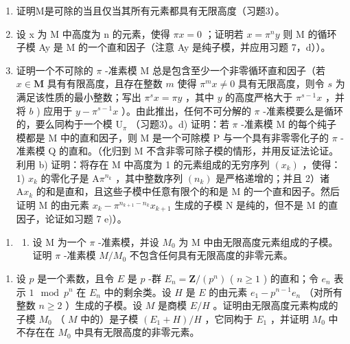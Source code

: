 \begin{enumerate}
\def\labelenumi{\alph{enumi})}
\item
  证明M是可除的当且仅当其所有元素都具有无限高度（习题3）。
\item
  设 x 为 M 中高度为 n 的元素，使得 \(\pi x = 0\) ；证明若 \(x = \pi^{n}y\) 则 M 的循环子模 Ay 是 M 的一个直和因子（注意 Ay 是纯子模，并应用习题 7，d））。
\item
  证明一个不可除的 \(\pi\) -准素模 M 总是包含至少一个非零循环直和因子（若 \(x \in \mathbf{M}\) 具有有限高度，且存在整数 \(m\) 使得 \(\pi^m x \neq 0\) 具有无限高度，则令 \(s\) 为满足该性质的最小整数；写出 \(\pi^s x = \pi y\) ，其中 \(y\) 的高度严格大于 \(\pi^{s-1}x\) ，并将 \(b\) ) 应用于 \(y - \pi^{s-1}x\) ）。由此推出，任何不可分解的 \(\pi\) -准素模要么是循环的，要么同构于一个模 \(\mathrm{U}_{\pi}\) （习题3）。d) 证明：若 \(\pi\) -准素模 M 的每个纯子模都是 M 中的直和因子，则 M 是一个可除模 P 与一个具有非零零化子的 \(\pi\) -准素模 Q 的直和。（化归到 M 不含非零可除子模的情形，并用反证法论证。利用 b) 证明：将存在 M 中高度为 1 的元素组成的无穷序列 \((x_k)\) ，使得：1) \(x_k\) 的零化子是 \(\mathrm{A}\pi^{n_k}\) ，其中整数序列 \((n_k)\) 是严格递增的；并且 2）诸 \(\mathrm{A}x_k\) 的和是直和，且这些子模中任意有限个的和是 M 的一个直和因子。然后证明 M 的由元素 \(x_k - \pi^{n_{k+1} - n_k}x_{k+1}\) 生成的子模 N 是纯的，但不是 M 的直因子，论证如习题 7 e)）。
\end{enumerate}

\begin{enumerate}
\def\labelenumi{\arabic{enumi})}
\setcounter{enumi}{8}
\tightlist
\item
  \begin{enumerate}
  \def\labelenumii{\alph{enumii})}
  \tightlist
  \item
    设 M 为一个 \(\pi\) -准素模，并设 \(M_{0}\) 为 M 中由无限高度元素组成的子模。证明 \(\pi\) -准素模 \(M/M_{0}\) 不包含任何具有无限高度的非零元素。
  \end{enumerate}
\end{enumerate}

\begin{enumerate}
\def\labelenumi{\alph{enumi})}
\setcounter{enumi}{1}
\tightlist
\item
  设 \(p\) 是一个素数，且令 \(E\) 是 \(p\) -群 \(E_n = \mathbf{Z} / (p^n)\) ( \(n \geqslant 1\) ) 的直和；令 \(e_n\) 表示 \(1 \mod p^n\) 在 \(E_n\) 中的剩余类。设 \(H\) 是 \(E\) 的由元素 \(e_1 - p^{n-1}e_n\) （对所有整数 \(n \geqslant 2\) ）生成的子模。设 \(M\) 是商模 \(E / H\) 。证明由无限高度元素构成的子模 \(M_0\) （ \(M\) 中的）是子模 \((E_1 + H) / H\) ，它同构于 \(E_1\) ，并证明 \(M_0\) 中不存在在 \(M_0\) 中具有无限高度的非零元素。
\end{enumerate}

